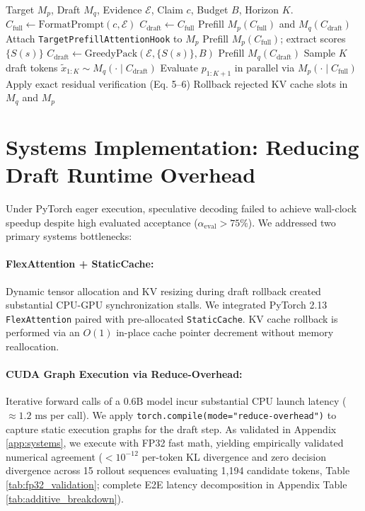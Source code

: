 \documentclass[11pt]{article}
\begin{document}
\begin{algorithm}[t]
\caption{SPADE Speculative Decoding}
\label{alg:spade}
\small
\begin{algorithmic}[1]
\Require Target $M_p$, Draft $M_q$, Evidence $\mathcal{E}$, Claim $c$, Budget $B$, Horizon $K$.
\State $C_{\text{full}} \gets \text{FormatPrompt}(c, \mathcal{E})$
    \State $C_{\text{draft}} \gets C_{\text{full}}$ 
    \State Prefill $M_p(C_{\text{full}})$ and $M_q(C_{\text{draft}})$
\Else
    \State Attach \texttt{TargetPrefillAttentionHook} to $M_p$
    \State Prefill $M_p(C_{\text{full}})$; extract scores $\{S(s)\}$
    \State $C_{\text{draft}} \gets \text{GreedyPack}(\mathcal{E}, \{S(s)\}, B)$
    \State Prefill $M_q(C_{\text{draft}})$
\EndIf
{}
    \State Sample $K$ draft tokens $\tilde{x}_{1:K} \sim M_q(\cdot \mid C_{\text{draft}})$
    \State Evaluate $p_{1:K+1}$ in parallel via $M_p(\cdot \mid C_{\text{full}})$
    \State Apply exact residual verification (Eq. 5--6)
    \State Rollback rejected KV cache slots in $M_q$ and $M_p$
\EndWhile
\end{algorithmic}
\end{algorithm}



\section{Systems Implementation: Reducing Draft Runtime Overhead}
\label{sec:systems}

Under PyTorch eager execution, speculative decoding failed to achieve wall-clock speedup despite high evaluated acceptance ($\alpha_{\text{eval}} > 75\%$). We addressed two primary systems bottlenecks:
\paragraph{FlexAttention + StaticCache:}
Dynamic tensor allocation and KV resizing during draft rollback created substantial CPU-GPU synchronization stalls. We integrated PyTorch 2.13 \texttt{FlexAttention} paired with pre-allocated \texttt{StaticCache}. KV cache rollback is performed via an $O(1)$ in-place cache pointer decrement without memory reallocation.
\paragraph{CUDA Graph Execution via Reduce-Overhead:}
Iterative forward calls of a $0.6\text{B}$ model incur substantial CPU launch latency ($\approx 1.2\text{ ms}$ per call). We apply \texttt{torch.compile(mode="reduce-overhead")} to capture static execution graphs for the draft step. As validated in Appendix \ref{app:systems}, we execute with FP32 fast math, yielding empirically validated numerical agreement ($< 10^{-12}$ per-token KL divergence and zero decision divergence across 15 rollout sequences evaluating 1,194 candidate tokens, Table \ref{tab:fp32_validation}; complete E2E latency decomposition in Appendix Table \ref{tab:additive_breakdown}).
\end{document}
